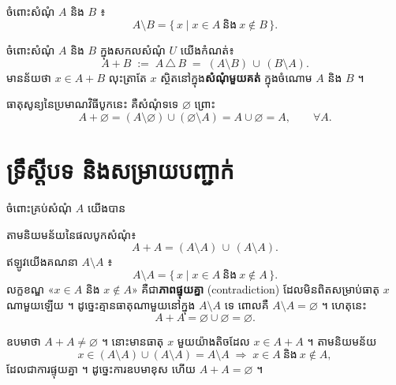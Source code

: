 \documentclass[12pt,a4paper]{article}
\newcommand{\keyformula}[1]{%
  \begin{center}\tcbox[enhanced,colback=white,colframe=crimson,boxrule=1.2pt,
    arc=4pt,left=10pt,right=10pt,top=4pt,bottom=4pt]{$\displaystyle #1$}\end{center}}
\begin{document}
\begin{definition}[ផលដកសំណុំ]
ចំពោះសំណុំ $A$ និង $B$ ៖
\[
  A \setminus B = \{\, x \mid x \in A \ \text{និង}\ x \notin B \,\}.
\]
\end{definition}

\begin{definition}
ចំពោះសំណុំ $A$ និង $B$ ក្នុងសកលសំណុំ $U$ យើងកំណត់៖
\[
  A + B \;:=\; A \,\triangle\, B \;=\; (A\setminus B)\,\cup\,(B\setminus A).
\]
មានន័យថា $x\in A+B$ លុះត្រាតែ $x$ ស្ថិតនៅក្នុង\textbf{សំណុំមួយគត់}
ក្នុងចំណោម $A$ និង $B$ ។
\end{definition}

\begin{definition}[សូន្យ]
ធាតុសូន្យនៃប្រមាណវិធីបូកនេះ គឺសំណុំទទេ $\varnothing$ ព្រោះ
\[
  A + \varnothing = (A\setminus\varnothing)\cup(\varnothing\setminus A)
  = A\cup\varnothing = A, \qquad \forall A .
\]
\end{definition}

\section{ទ្រឹស្តីបទ និងសម្រាយបញ្ជាក់}

\begin{theorem}
ចំពោះគ្រប់សំណុំ $A$ យើងបាន
\keyformula{A + A = \varnothing}
\end{theorem}

\begin{proofbox}[វិធីទី១ ៖ តាមនិយមន័យ]
តាមនិយមន័យនៃផលបូកសំណុំ៖
\[
  A + A = (A\setminus A)\,\cup\,(A\setminus A).
\]
ឥឡូវយើងគណនា $A\setminus A$ ៖
\[
  A\setminus A = \{\, x \mid x\in A \ \text{និង}\ x\notin A \,\}.
\]
លក្ខខណ្ឌ «$x\in A$ និង $x\notin A$» គឺជា\textbf{\color{crimson}ភាពផ្ទុយគ្នា}
(contradiction) ដែលមិនពិតសម្រាប់ធាតុ $x$ ណាមួយឡើយ ។
ដូច្នេះគ្មានធាតុណាមួយនៅក្នុង $A\setminus A$ ទេ ពោលគឺ
$A\setminus A = \varnothing$ ។ ហេតុនេះ
\[
  A + A = \varnothing\cup\varnothing = \varnothing .
\]
\end{proofbox}

\begin{proofbox}[វិធីទី២ ៖ ដោយភាពផ្ទុយ]
ឧបមាថា $A + A \neq \varnothing$ ។ នោះមានធាតុ $x$ មួយយ៉ាងតិចដែល
$x\in A + A$ ។ តាមនិយមន័យ
\[
  x\in (A\setminus A)\cup(A\setminus A) = A\setminus A
  \;\Longrightarrow\; x\in A \ \text{និង}\ x\notin A ,
\]
ដែលជាការផ្ទុយគ្នា ។ ដូច្នេះការឧបមាខុស ហើយ $A + A = \varnothing$ ។
\end{proofbox}
\end{document}
